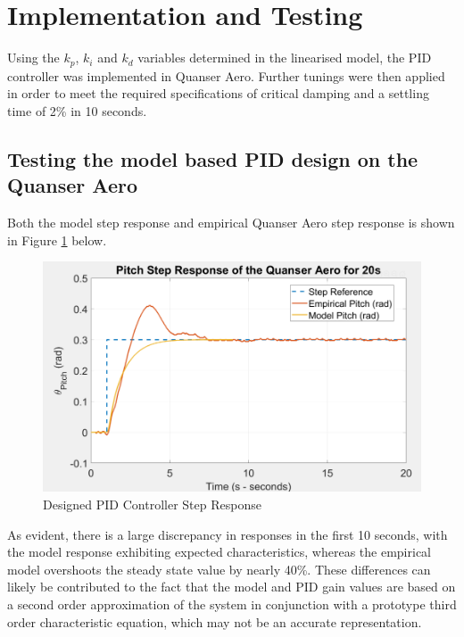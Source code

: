 \documentclass[11pt]{article}
\begin{document}
\section{Implementation and Testing}
Using the $k_p$, $k_i$ and $k_d$ variables determined in the linearised model, the PID controller was implemented in Quanser Aero. Further tunings were then applied in order to meet the required specifications of critical damping and a settling time of 2\% in 10 seconds.

\subsection{Testing the model based PID design on the Quanser Aero}
Both the model step response and empirical Quanser Aero step response is shown in Figure \ref{fig:W2UFStep} below.
\begin{figure}[ht!]
    \centering
    \includegraphics[scale=0.5]{WS2_PID_Test.PNG}  %
    \caption{Designed PID Controller Step Response}
    \label{fig:W2UFStep}
\end{figure}

 As evident, there is a large discrepancy in responses in the first 10 seconds, with the model response exhibiting expected characteristics, whereas the empirical model overshoots the steady state value by nearly 40\%. These differences can likely be contributed to the fact that the model and PID gain values are based on a second order approximation of the system in conjunction with a prototype third order characteristic equation, which may not be an accurate representation. \\
 
\end{document}
